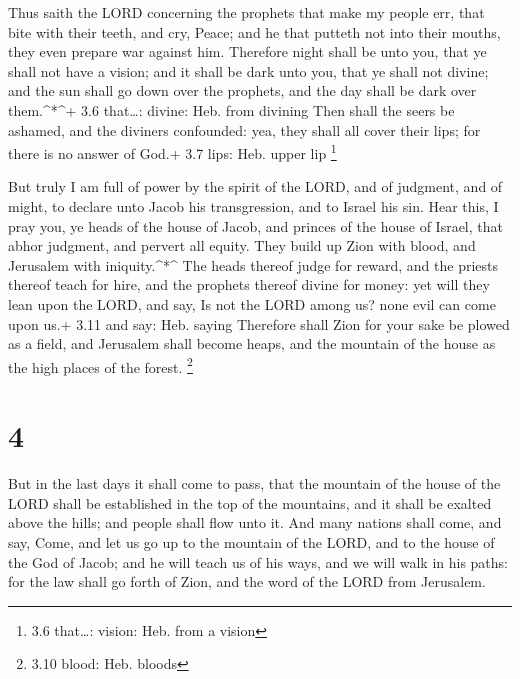  Thus saith the LORD concerning the prophets that make my
people err, that bite with their teeth, and cry, Peace; and he that
putteth not into their mouths, they even prepare war against him.
 Therefore night shall be unto you, that ye shall not have a
vision; and it shall be dark unto you, that ye shall not divine; and the
sun shall go down over the prophets, and the day shall be dark over
them.\^{}*\^{}+ 3.6 that\ldots: divine: Heb. from divining 
Then shall the seers be ashamed, and the diviners confounded: yea, they
shall all cover their lips; for there is no answer of God.+ 3.7 lips:
Heb. upper lip \footnote{3.6 that\ldots: vision: Heb. from a vision}

 But truly I am full of power by the spirit of the LORD, and
of judgment, and of might, to declare unto Jacob his transgression, and
to Israel his sin.  Hear this, I pray you, ye heads of the
house of Jacob, and princes of the house of Israel, that abhor judgment,
and pervert all equity.  They build up Zion with blood, and
Jerusalem with iniquity.\^{}*\^{}  The heads thereof judge
for reward, and the priests thereof teach for hire, and the prophets
thereof divine for money: yet will they lean upon the LORD, and say, Is
not the LORD among us? none evil can come upon us.+ 3.11 and say: Heb.
saying  Therefore shall Zion for your sake be plowed as a
field, and Jerusalem shall become heaps, and the mountain of the house
as the high places of the forest. \footnote{3.10 blood: Heb. bloods}

\hypertarget{section-3}{%
\section{4}\label{section-3}}

 But in the last days it shall come to pass, that the
mountain of the house of the LORD shall be established in the top of the
mountains, and it shall be exalted above the hills; and people shall
flow unto it.  And many nations shall come, and say, Come,
and let us go up to the mountain of the LORD, and to the house of the
God of Jacob; and he will teach us of his ways, and we will walk in his
paths: for the law shall go forth of Zion, and the word of the LORD from
Jerusalem.

